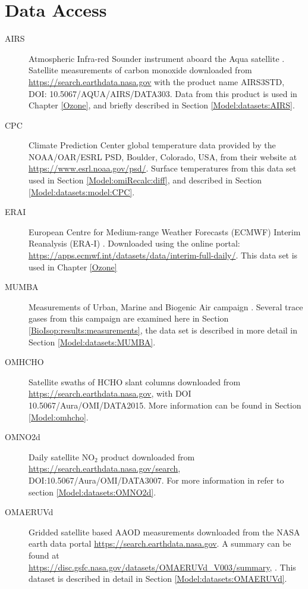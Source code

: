 \section{Data Access}
\label{Model:DataAccess}
\begin{description}
  \item[AIRS] Atmospheric Infra-red Sounder instrument aboard the Aqua satellite \parencite{AIRS3STD}.
  Satellite measurements of carbon monoxide downloaded from \url{https://search.earthdata.nasa.gov} with the product name AIRS3STD, DOI: 10.5067/AQUA/AIRS/DATA303.
  Data from this product is used in Chapter \ref{Ozone}, and briefly described in Section \ref{Model:datasets:AIRS}.
  
  \item[CPC] Climate Prediction Center global temperature data provided by the NOAA/OAR/ESRL PSD, Boulder, Colorado, USA, from their website at \url{https://www.esrl.noaa.gov/psd/}.
  Surface temperatures from this data set used in Section \ref{Model:omiRecalc:diff}, and described in Section \ref{Model:datasets:model:CPC}.
  
  \item[ERAI] European Centre for Medium-range Weather Forecasts (ECMWF) Interim Reanalysis (ERA-I) \parencite{Dee2011}. 
  Downloaded using the online portal: \url{https://apps.ecmwf.int/datasets/data/interim-full-daily/}.
  This data set is used in Chapter \ref{Ozone}
  
  \item[MUMBA] Measurements of Urban, Marine and Biogenic Air campaign \parencite{PatonWalsh2017}.
  Several trace gases from this campaign are examined here in Section \ref{BioIsop:results:measurements}, the data set is described in more detail in Section \ref{Model:datasets:MUMBA}.
  
  
  \item[OMHCHO] Satellite swaths of HCHO slant columns downloaded from \url{https://search.earthdata.nasa.gov}, with DOI 10.5067/Aura/OMI/DATA2015.
  More information can be found in Section \ref{Model:omhcho}.
  
  \item[OMNO2d] Daily satellite NO$_2$ product downloaded from \url{https://search.earthdata.nasa.gov/search}, DOI:10.5067/Aura/OMI/DATA3007. 
  For more information in refer to section \ref{Model:datasets:OMNO2d}.
  
  \item[OMAERUVd] Gridded satellite based AAOD measurements downloaded from the NASA earth data portal \url{https://search.earthdata.nasa.gov}.
  A summary can be found at \url{https://disc.gsfc.nasa.gov/datasets/OMAERUVd_V003/summary}, .
  This dataset is described in detail in Section \ref{Model:datasets:OMAERUVd}.
  

\end{description}
